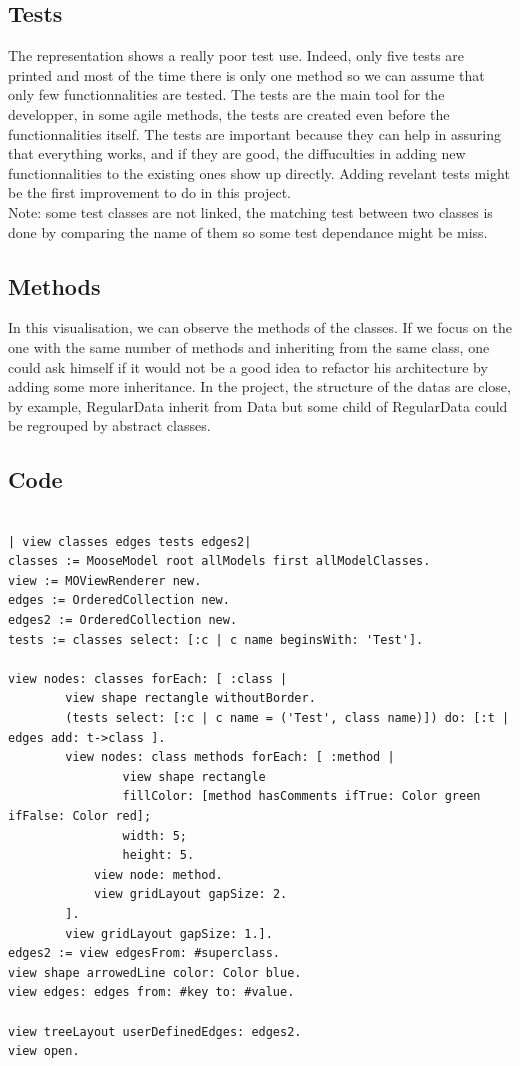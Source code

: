 \documentclass[a4paper,10pt]{article}
\begin{document}
\subsection{Tests}
The representation shows a really poor test use. Indeed, only five tests are printed and most of the time there is only one method so we can assume that only few functionnalities are tested. The tests are the main tool for the developper, in some agile methods, the tests are created even before the functionnalities itself. The tests are important because they can help in assuring that everything works, and if they are good, the diffuculties in adding new functionnalities to the existing ones show up directly. Adding revelant tests might be the first improvement to do in this project.\\
Note: some test classes are not linked, the matching test between two classes is done by comparing the name of them so some test dependance might be miss.

\subsection{Methods}
In this visualisation, we can observe the methods of the classes. If we focus on the one with the same number of methods and inheriting from the same class, one could ask himself if it would not be a good idea to refactor his architecture by adding some more inheritance. In the project, the structure of the datas are close, by example, RegularData inherit from Data but some child of RegularData could be regrouped by abstract classes.

\subsection{Code}
\begin{verbatim}

| view classes edges tests edges2|
classes := MooseModel root allModels first allModelClasses.
view := MOViewRenderer new.
edges := OrderedCollection new.
edges2 := OrderedCollection new.
tests := classes select: [:c | c name beginsWith: 'Test'].

view nodes: classes forEach: [ :class |
        view shape rectangle withoutBorder.
        (tests select: [:c | c name = ('Test', class name)]) do: [:t | edges add: t->class ].
        view nodes: class methods forEach: [ :method | 
                view shape rectangle 
                fillColor: [method hasComments ifTrue: Color green ifFalse: Color red];
                width: 5;
                height: 5.
            view node: method. 
            view gridLayout gapSize: 2.
        ].
        view gridLayout gapSize: 1.].
edges2 := view edgesFrom: #superclass.
view shape arrowedLine color: Color blue.
view edges: edges from: #key to: #value.

view treeLayout userDefinedEdges: edges2.
view open.
\end{verbatim}
\end{document}
